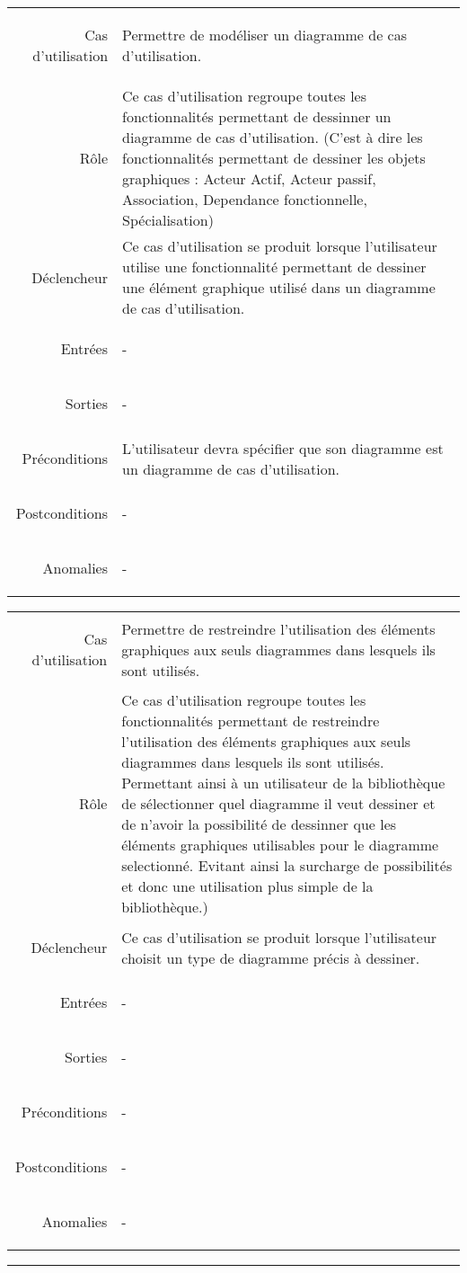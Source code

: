 \documentclass[12pt,a4paper,openany]{report}
\newcommand{\separateur}{\begin{center}\rule{12.6cm}{.5pt}\end{center}}
\begin{document}
	\begin{longtable}{>{\begin{bf}} r <{\end{bf}}!{:}p{13.5cm}}
	Cas d'utilisation & Permettre de modéliser un diagramme de cas d'utilisation.\\
	Rôle & Ce cas d'utilisation regroupe toutes les fonctionnalités permettant de dessinner un diagramme de cas d'utilisation.
	(C'est à dire les fonctionnalités permettant de dessiner les objets graphiques : Acteur Actif, Acteur passif, Association,
	Dependance fonctionnelle, Spécialisation)\\
	Déclencheur & Ce cas d'utilisation se produit lorsque l'utilisateur utilise une fonctionnalité permettant de dessiner une
	élément graphique utilisé dans un diagramme de cas d'utilisation.\\
	Entrées & -\\
	Sorties & -\\
	Préconditions & L'utilisateur devra spécifier que son diagramme est un diagramme de cas d'utilisation.\\
	Postconditions & -\\
	Anomalies & -\\
	\end{longtable}
	\begin{longtable}{>{\begin{bf}} r <{\end{bf}}!{:}p{13.5cm}}
	Cas d'utilisation & Permettre de restreindre l'utilisation des éléments graphiques aux seuls diagrammes dans lesquels ils sont utilisés.\\
	Rôle & Ce cas d'utilisation regroupe toutes les fonctionnalités permettant de restreindre l'utilisation des éléments
	graphiques aux seuls diagrammes dans lesquels ils sont utilisés. Permettant ainsi à un utilisateur de la bibliothèque de sélectionner quel
	diagramme il veut dessiner et de n'avoir la possibilité de dessinner que les éléments graphiques utilisables pour le diagramme selectionné.
	Evitant ainsi la surcharge de possibilités et donc une utilisation plus simple de la bibliothèque.)\\
	Déclencheur & Ce cas d'utilisation se produit lorsque l'utilisateur choisit un type de diagramme précis à dessiner.\\
	Entrées & -\\
	Sorties & -\\
	Préconditions & -\\
	Postconditions & -\\
	Anomalies & -\\
	\end{longtable}
	\separateur
\end{document}
